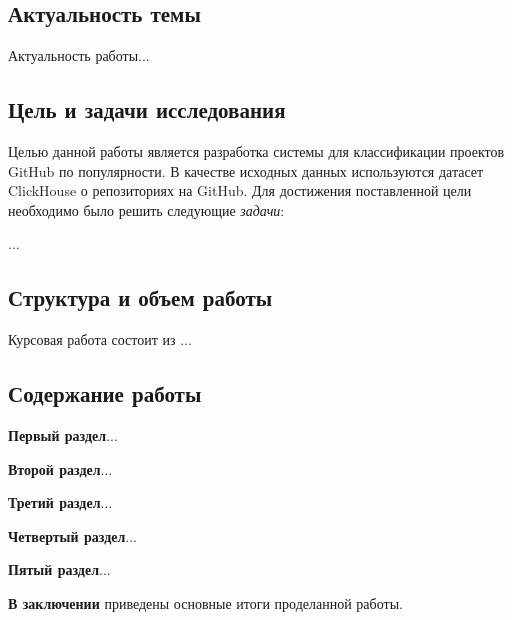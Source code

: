 \newpage
{}
\subsection*{Актуальность темы}
Актуальность работы... \fxnote{}
\subsection*{Цель и задачи исследования}
Целью данной работы является разработка системы для классификации проектов GitHub по популярности. В качестве исходных данных используются датасет ClickHouse о репозиториях на GitHub. Для достижения поставленной цели необходимо было решить следующие \textit{задачи}:
\begin{enumerateparen}
	\item ... \fxnote{}
\end{enumerateparen}
\vspace{0.5em}
\subsection*{Структура и объем работы}

Курсовая работа состоит из ... \fxnote{}

\subsection*{Содержание работы}

\textbf{Первый раздел}...

\textbf{Второй раздел}...

\textbf{Третий раздел}...

\textbf{Четвертый раздел}...

\textbf{Пятый раздел}...

\textbf{В заключении} приведены основные итоги проделанной работы.